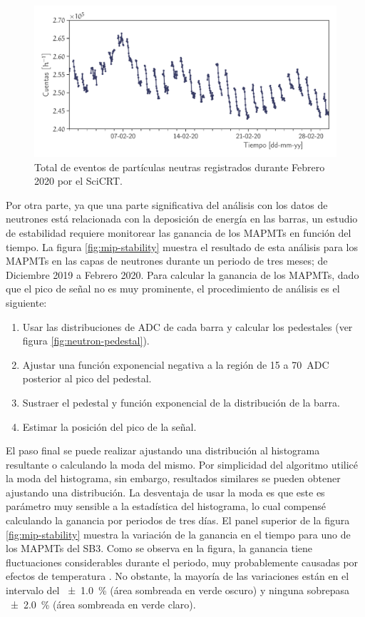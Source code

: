 \begin{figure}
        \centering
        \includegraphics[width=\textwidth]{neutron-monthly.pdf}
        \caption{Total de eventos de partículas neutras registrados durante Febrero \num{2020} por el SciCRT.}
        \label{fig:neutron-monthly}
\end{figure}

Por otra parte, ya que una parte significativa del análisis con los datos de neutrones está relacionada con la deposición de energía en las barras, un estudio de estabilidad requiere monitorear las ganancia de los MAPMTs en función del tiempo. La figura \ref{fig:mip-stability} muestra el resultado de esta análisis para los MAPMTs en las capas de neutrones durante un periodo de tres meses; de Diciembre \num{2019} a Febrero \num{2020}. Para calcular la ganancia de los MAPMTs, dado que el pico de señal no es muy prominente, el procedimiento de análisis es el siguiente:

\begin{enumerate}
  \item Usar las distribuciones de ADC de cada barra y calcular los pedestales (ver figura \ref{fig:neutron-pedestal}).
  \item Ajustar una función exponencial negativa a la región de \num{15} a \SI{70}{ADC} posterior al pico del pedestal.
  \item Sustraer el pedestal y función exponencial de la distribución de la barra.
  \item Estimar la posición del pico de la señal.
\end{enumerate}

El paso final se puede realizar ajustando una distribución al histograma resultante o calculando la moda del mismo. Por simplicidad del algoritmo utilicé la moda del histograma, sin embargo, resultados similares se pueden obtener ajustando una distribución. La desventaja de usar la moda es que este es parámetro muy sensible a la estadística del histograma, lo cual compensé calculando la ganancia por periodos de tres días. El panel superior de la figura \ref{fig:mip-stability} muestra la variación de la ganancia en el tiempo para uno de los MAPMTs del SB3. Como se observa en la figura, la ganancia tiene fluctuaciones considerables durante el periodo, muy probablemente causadas por efectos de temperatura \cite{knitta04}. No obstante, la mayoría de las variaciones están en el intervalo del \SI{\pm 1.0}{\percent} (área sombreada en verde oscuro) y ninguna sobrepasa \SI{\pm 2.0}{\percent} (área sombreada en verde claro).

